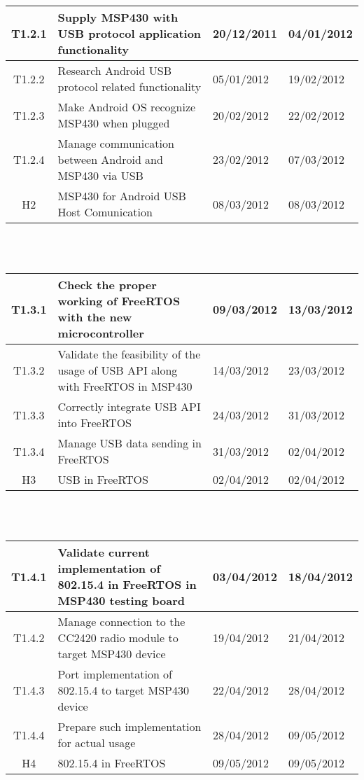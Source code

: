 		\begin{tabular}{| c | p{6cm} | l | l |} %
		\hline
			T1.2.1 & Supply MSP430 with USB protocol application functionality & 20/12/2011 & 04/01/2012\\ \hline
			T1.2.2 & Research Android USB protocol related functionality & 05/01/2012 & 19/02/2012\\ \hline
			T1.2.3 & Make Android OS recognize MSP430 when plugged	 & 20/02/2012 & 22/02/2012\\ \hline
T1.2.4 & Manage communication between Android and MSP430 via USB & 23/02/2012 & 07/03/2012\\ \hline
			H2 & MSP430 for Android USB Host Comunication & 08/03/2012 & 08/03/2012\\ \hline
		\end{tabular}\\\\

		\begin{tabular}{| c | p{6cm} | l | l |} %
		\hline
T1.3.1 & Check the proper working of FreeRTOS with the new microcontroller & 09/03/2012 & 13/03/2012\\ \hline
T1.3.2 & Validate the feasibility of the usage of USB API along with FreeRTOS in MSP430 & 14/03/2012 & 23/03/2012\\ \hline
T1.3.3 & Correctly integrate USB API into FreeRTOS & 24/03/2012 & 31/03/2012\\ 

T1.3.4 & Manage USB data sending in FreeRTOS & 31/03/2012 & 02/04/2012\\ \hline
H3 & USB in FreeRTOS & 02/04/2012 & 02/04/2012\\ \hline
\end{tabular}\\\\

\begin{tabular}{| c | p{6cm} | l | l |} %
\hline
		T1.4.1 & Validate current implementation of 802.15.4 in FreeRTOS in MSP430 testing board & 03/04/2012 & 18/04/2012\\ \hline
		T1.4.2 & Manage connection to the CC2420 radio module to target MSP430 device & 19/04/2012 & 21/04/2012\\ \hline
		T1.4.3 & Port implementation of 802.15.4 to target MSP430 device & 22/04/2012 & 28/04/2012\\ \hline
		T1.4.4 & Prepare such implementation for actual usage & 28/04/2012 & 09/05/2012\\ \hline
		H4 & 802.15.4 in FreeRTOS & 09/05/2012 & 09/05/2012\\
		\hline
		\end{tabular}\\\\

